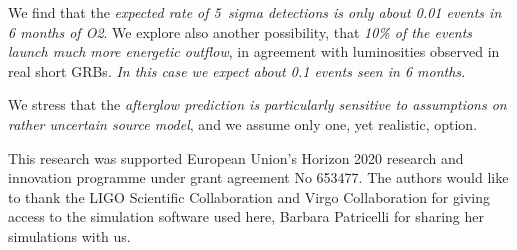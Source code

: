 \documentclass[12pt, a4]{article}
\begin{document}
We find that the \emph{expected rate of 5~sigma detections is only about
0.01 events in 6 months of O2}. We explore also another
possibility, that \emph{10\% of the events launch much more energetic
outflow}, in agreement with luminosities observed in real short
GRBs. \emph{In this case we expect about 0.1 events seen in 6 months.} 

We stress that the \emph{afterglow prediction is particularly sensitive to
assumptions on rather uncertain source model}, and we assume only
one, yet realistic, option.

\vspace{10mm}


{\linespread{0.1} \footnotesize This research was supported European Union’s Horizon 2020 research and
  innovation programme under grant agreement No 653477. The authors would like
  to thank the LIGO Scientific Collaboration and Virgo Collaboration for giving
  access to the simulation software used here, Barbara Patricelli for sharing
  her simulations with us.}


{\footnotesize
}
\end{document}
